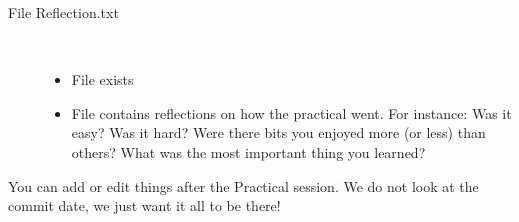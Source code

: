 \documentclass[pdflatex,a4paper]{article}
\begin{document}
\begin{description}
\item[File Reflection.txt]$\;$\\

\begin{itemize}
\item
File exists
\item
File contains reflections on how the practical went. For instance: Was it easy? Was it hard? Were there bits you enjoyed more (or less) than others? What was the most important thing you learned? 
\end{itemize}

\end{description}



You can add or edit things after the Practical session. We do not look at the commit date, we just want it all to be there!
\end{document}
